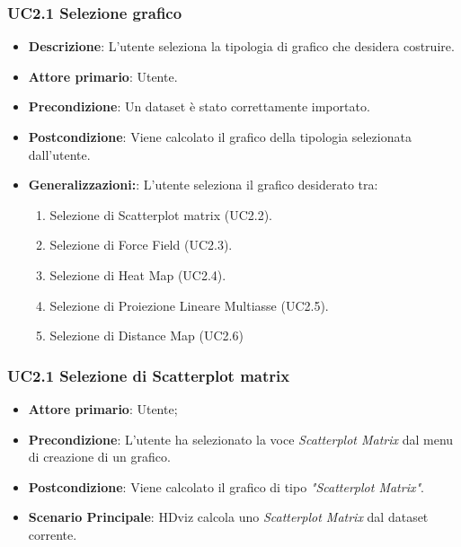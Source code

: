 \subsubsection{UC2.1 Selezione grafico}
\label{ssub:UC2.1}
\begin{itemize}

	\item \textbf{Descrizione}: L’utente seleziona la tipologia di grafico che desidera costruire.

    \item \textbf{Attore primario}: Utente.

	\item \textbf{Precondizione}:   Un dataset è stato correttamente importato. 
	
    \item \textbf{Postcondizione}:  Viene calcolato il grafico della tipologia selezionata dall'utente.

	\item \textbf{Generalizzazioni:}:  L'utente seleziona il grafico desiderato tra:

		\begin{enumerate}
			
			\item Selezione di Scatterplot matrix (UC2.2).
			\item Selezione di Force Field (UC2.3).
			\item Selezione di Heat Map (UC2.4).
			\item Selezione di Proiezione Lineare Multiasse (UC2.5).
			\item Selezione di Distance Map (UC2.6)
			
		\end{enumerate}

\end{itemize}


\subsubsection{UC2.1 Selezione di Scatterplot matrix}
\label{ssub:UC2.2}
\begin{itemize}

    \item \textbf{Attore primario}: Utente;

    \item \textbf{Precondizione}:   L'utente ha selezionato la voce \emph{Scatterplot Matrix} dal menu di creazione di un grafico.

    \item \textbf{Postcondizione}:  Viene calcolato il grafico di tipo \emph{"Scatterplot Matrix"}.

	\item \textbf{Scenario Principale}: HDviz calcola uno \emph{Scatterplot Matrix} dal dataset corrente.
\end{itemize}


